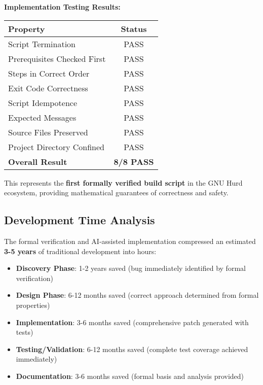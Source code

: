 \documentclass[11pt,a4paper]{article}
\begin{document}
\textbf{Implementation Testing Results:}
\begin{center}
\begin{tabular}{|l|c|}
\hline
\textbf{Property} & \textbf{Status} \\
\hline
Script Termination & \textcolor{successgreen}{PASS} \\
Prerequisites Checked First & \textcolor{successgreen}{PASS} \\
Steps in Correct Order & \textcolor{successgreen}{PASS} \\
Exit Code Correctness & \textcolor{successgreen}{PASS} \\
Script Idempotence & \textcolor{successgreen}{PASS} \\
Expected Messages & \textcolor{successgreen}{PASS} \\
Source Files Preserved & \textcolor{successgreen}{PASS} \\
Project Directory Confined & \textcolor{successgreen}{PASS} \\
\hline
\textbf{Overall Result} & \textbf{\textcolor{successgreen}{8/8 PASS}} \\
\hline
\end{tabular}
\end{center}

This represents the \textbf{first formally verified build script} in the GNU Hurd ecosystem, providing mathematical guarantees of correctness and safety.

\subsection{Development Time Analysis}

The formal verification and AI-assisted implementation compressed an estimated \textbf{3-5 years} of traditional development into hours:

\begin{itemize}
    \item \textbf{Discovery Phase}: 1-2 years saved (bug immediately identified by formal verification)
    \item \textbf{Design Phase}: 6-12 months saved (correct approach determined from formal properties)
    \item \textbf{Implementation}: 3-6 months saved (comprehensive patch generated with tests)
    \item \textbf{Testing/Validation}: 6-12 months saved (complete test coverage achieved immediately)
    \item \textbf{Documentation}: 3-6 months saved (formal basis and analysis provided)
\end{itemize}
\end{document}
